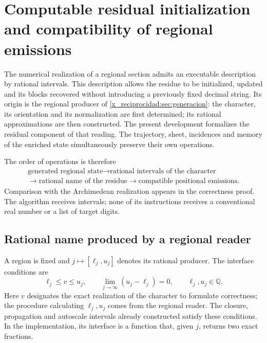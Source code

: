
\section{Computable residual initialization and compatibility of regional emissions}
\label{sec:residuo-regional-computable}

The numerical realization of a regional section admits an executable
description by rational intervals. This description allows the residue
to be initialized, updated and its blocks recovered without introducing a previously
fixed decimal string. Its origin is the regional producer of
\cref{x_reciprocidad:sec:generacion}: the character,
its orientation and its normalization are first determined; its rational
approximations are then constructed. The present development formalizes the residual component of that
reading. The trajectory, sheet, incidences and memory of the enriched
state simultaneously preserve their own operations.

The order of operations is therefore
\[
 \begin{gathered}
 \text{generated regional state}
 \longrightarrow \text{rational intervals of the character}
 \\
 \longrightarrow \text{rational name of the residue}
 \longrightarrow \text{compatible positional emissions}.
 \end{gathered}
\]
Comparison with the Archimedean realization appears in the correctness
proof. The algorithm receives intervals; none of its instructions
receives a conventional real number or a list of target digits.

\subsection{Rational name produced by a regional reader}
\label{subsec:residual-nombre-racional}

A region is fixed and \(j\mapsto[\ell_j,u_j]\) denotes its rational
producer. The interface conditions are
\begin{equation}
 \ell_j\leq v\leq u_j,\qquad
 \lim_{j\to\infty}(u_j-\ell_j)=0,
 \qquad \ell_j,u_j\in\mathbb Q.
 \label{eq:residual-contrato-productor}
\end{equation}
Here \(v\) designates the exact realization of the character to formulate
correctness; the procedure calculating \(\ell_j,u_j\) comes from the regional
reader. The closure, propagation and autoscale intervals already
constructed satisfy these conditions. In the implementation, its interface
is a function that, given \(j\), returns two exact fractions.

